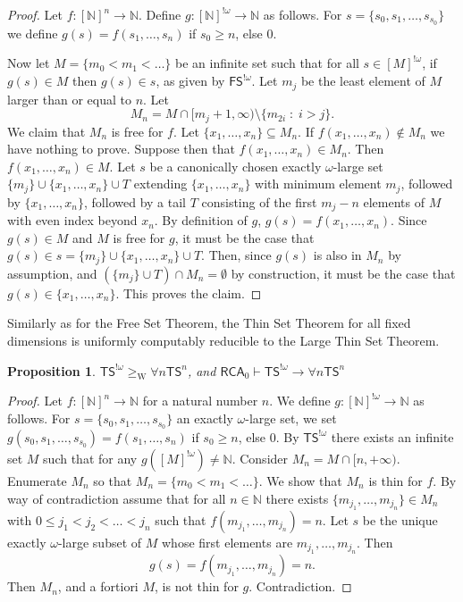 \documentclass[10pt,a4paper]{article}
\newcommand{\RCA}[0]{\mathsf{RCA}}
\newcommand{\FS}[0]{\mathsf{FS}}
\newcommand{\TS}[0]{\mathsf{TS}}
\newcommand{\NN}[0]{\mathbb{N}}
\newcommand{\W}{\mathrm{W}}
\numberwithin{theorem}{section}
\newtheorem{proposition}[theorem]{Proposition}
\begin{document}
\begin{proof}
Let $f:[\NN]^n\to \NN$. Define $g:[\NN]^{!\omega} \to \NN$ as follows. For $s = \{s_0, s_1, \dots, s_{s_0}\}$ we define 
$g(s) = f(s_1, \dots, s_n)$ if $s_0 \geq n$, else $0$. 

Now let $M= \{ m_0 < m_1 < \dots\}$ be an infinite set such that for all $s\in [M]^{!\omega}$, if $g(s) \in M$ then 
$g(s) \in s$, as given by $\FS^{!\omega}$.
Let $m_j$ be the least element of $M$ larger than or equal to $n$. Let 
$$M_n=M \cap [m_j + 1, \infty) \setminus \{ m_{2i} \;:\; i > j \}.$$ 
We claim that $M_n$ is free for $f$. Let $\{x_1, \dots, x_n\}\subseteq M_n$. 
If $f(x_1, \dots, x_n) \notin M_n$ we have nothing to prove. Suppose then that
$f(x_1, \dots, x_n) \in M_n$. Then $f(x_1, \dots, x_n) \in M$. 
Let $s$ be a canonically chosen exactly $\omega$-large set $\{m_j\}\cup \{ x_1, \dots, x_n\} \cup T$
extending $\{x_1, \dots, x_n\}$ with minimum 
element $m_j$, followed by $\{x_1, \dots, x_n\}$, followed by a tail $T$ consisting of the first $m_j - n$ elements of $M$ with even index
beyond $x_n$. 
By definition of $g$, $g(s) = f(x_1, \dots, x_n)$. Since $g(s) \in M$ and $M$ is free for $g$, 
it must be the case that $g(s) \in s=\{m_j\}\cup \{ x_1, \dots, x_n\} \cup T$. Then, since $g(s)$ is also in $M_n$ by assumption, 
and $(\{m_j\}\cup T) \cap M_n = \emptyset$ by construction, 
it must be the case that $g(s) \in \{x_1, \dots, x_n\}$. This proves the claim. 
\end{proof}

Similarly as for the Free Set Theorem, the Thin Set Theorem for all fixed dimensions is uniformly computably reducible to the Large Thin Set Theorem. 

\begin{proposition}
$\TS^{!\omega} \geq_{\W} \forall n \TS^n$, and $\RCA_0\vdash \TS^{!\omega} \to \forall n \TS^n$
\end{proposition}
\begin{proof}
	Let  $f:[\NN]^{n}\to\NN$ for a natural number $n$. We define $g:[\NN]^{!\omega}\to \NN$ as follows.
	For $s=\{s_0,s_1,\dots,s_{s_0}\}$ an exactly $\omega$-large set, we set $g(s_0,s_1,\dots, s_{s_0}) = f(s_1,\dots,s_n)$ if $s_0 \geq n$, else $0$. By $\TS^{!\omega}$ there exists an infinite set $M$ such that for any $g([M]^{!\omega})\neq \NN$. Consider $M_n = M \cap [n, +\infty)$.
	Enumerate $M_n$ so that $M_n=\{m_0<m_1<\dots\}$. 
 	We show that $M_n$ is thin for $f$. By way of contradiction assume that for all $n\in \NN$ there exists $\{m_{j_1},\dots,m_{j_n}\}\in M_n$ with $0\leq j_1 < j_2 < \dots < j_n$ such that $f(m_{j_1},\dots,m_{j_n})=n$. Let $s$ be the unique exactly $\omega$-large subset of $M$ whose first elements are $m_{j_1},\dots,m_{j_n}$. Then
$$g(s)= f(m_{j_1},\dots,m_{j_n})=n.$$
Then $M_n$, and a fortiori $M$, is not thin for $g$. Contradiction.
\end{proof}
\end{document}
